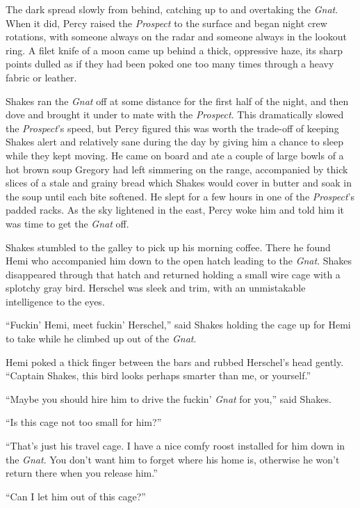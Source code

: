 \documentclass[
]{scrbook}
\begin{document}
The dark spread slowly from behind, catching up to and overtaking the
\emph{Gnat}. When it did, Percy raised the \emph{Prospect} to the
surface and began night crew rotations, with someone always on the radar
and someone always in the lookout ring. A filet knife of a moon came up
behind a thick, oppressive haze, its sharp points dulled as if they had
been poked one too many times through a heavy fabric or leather.

Shakes ran the \emph{Gnat} off at some distance for the first half of
the night, and then dove and brought it under to mate with the
\emph{Prospect}. This dramatically slowed the \emph{Prospect}'s speed,
but Percy figured this was worth the trade-off of keeping Shakes alert
and relatively sane during the day by giving him a chance to sleep while
they kept moving. He came on board and ate a couple of large bowls of a
hot brown soup Gregory had left simmering on the range, accompanied by
thick slices of a stale and grainy bread which Shakes would cover in
butter and soak in the soup until each bite softened. He slept for a few
hours in one of the \emph{Prospect}'s padded racks. As the sky lightened
in the east, Percy woke him and told him it was time to get the
\emph{Gnat} off.

\bigskip

Shakes stumbled to the galley to pick up his morning coffee. There he
found Hemi who accompanied him down to the open hatch leading to the
\emph{Gnat}. Shakes disappeared through that hatch and returned holding
a small wire cage with a splotchy gray bird. Herschel was sleek and
trim, with an unmistakable intelligence to the eyes.

``Fuckin' Hemi, meet fuckin' Herschel,'' said Shakes holding the cage up
for Hemi to take while he climbed up out of the \emph{Gnat}.

Hemi poked a thick finger between the bars and rubbed Herschel's head
gently. ``Captain Shakes, this bird looks perhaps smarter than me, or
yourself.''

``Maybe you should hire him to drive the fuckin' \emph{Gnat} for you,''
said Shakes.

``Is this cage not too small for him?''

``That's just his travel cage. I have a nice comfy roost installed for
him down in the \emph{Gnat}. You don't want him to forget where his home
is, otherwise he won't return there when you release him.''

``Can I let him out of this cage?''
\end{document}

